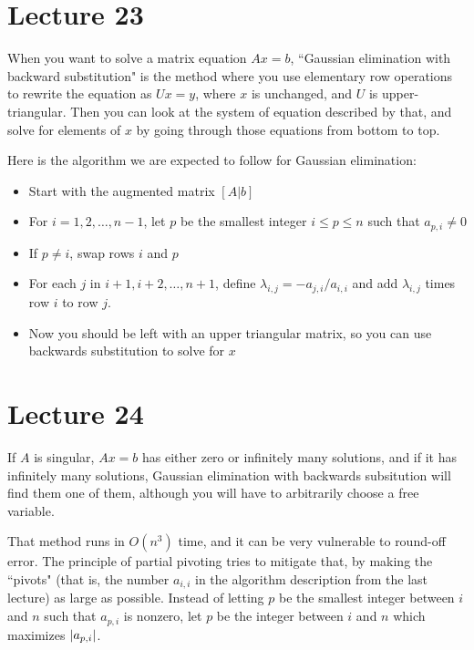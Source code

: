 \documentclass{article}
\begin{document}
\section{Lecture 23}
When you want to solve a matrix equation $Ax=b$, ``Gaussian elimination with backward substitution" is the method where you use elementary row operations to rewrite the equation as $Ux=y$, where $x$ is unchanged, and $U$ is upper-triangular. Then you can look at the system of equation described by that, and solve for elements of $x$ by going through those equations from bottom to top.
\par
Here is the algorithm we are expected to follow for Gaussian elimination:
\begin{itemize}
    \item Start with the augmented matrix $[A|b]$
    \item For $i=1,2,\dots, n-1$, let $p$ be the smallest integer $i\leq p \leq n$ such that $a_{p,i} \neq 0$
    \item If $p \neq i$, swap rows $i$ and $p$
    \item For each $j$ in $i+1,i+2,\dots, n+1$, define $\lambda_{i,j}=-a_{j,i}/a_{i,i}$ and add $\lambda_{i,j}$ times row $i$ to row $j$.
    \item Now you should be left with an upper triangular matrix, so you can use backwards substitution to solve for $x$
\end{itemize}

\section{Lecture 24}
If $A$ is singular, $Ax=b$ has either zero or infinitely many solutions, and if it has infinitely many solutions, Gaussian elimination with backwards subsitution will find them one of them, although you will have to arbitrarily choose a free variable.
\par
That method runs in $O(n^3)$ time, and it can be very vulnerable to round-off error. The principle of partial pivoting tries to mitigate that, by making the ``pivots" (that is, the number $a_{i,i}$ in the algorithm description from the last lecture) as large as possible. Instead of letting $p$ be the smallest integer between $i$ and $n$ such that $a_{p,i}$ is nonzero, let $p$ be the integer between $i$ and $n$ which maximizes $\left\lvert a_{p,i} \right\rvert$.
\end{document}
